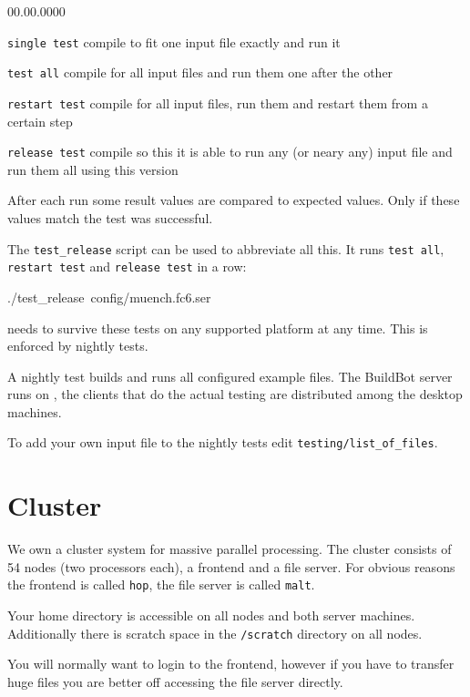 \begin{lyxlist}{00.00.0000}
\item [{\texttt{single~test}}] compile \ccarat{} to fit one input file
exactly and run it
\item [{\texttt{test~all}}] compile \ccarat{} for all input files and
run them one after the other
\item [{\texttt{restart~test}}] compile \ccarat{} for all input files,
run them and restart them from a certain step
\item [{\texttt{release~test}}] compile \ccarat{} so this it is able
to run any (or neary any) input file and run them all using this version
\end{lyxlist}
After each run some result values are compared to expected values.
Only if these values match the test was successful.

The \texttt{test\_release} script can be used to abbreviate all this.
It runs \texttt{test all}, \texttt{restart test} and \texttt{release
test} in a row:

\begin{lyxcode}
./test\_release~config/muench.fc6.ser
\end{lyxcode}
\ccarat{} needs to survive these tests on any supported platform
at any time. This is enforced by nightly tests.

A nightly test builds and runs all configured example files. The BuildBot
server runs on \gauss{}, the clients that do the actual testing are
distributed among the desktop machines.

To add your own input file to the nightly tests edit \texttt{testing/list\_of\_files}.


\section{Cluster}

We own a cluster system for massive parallel processing. The cluster
consists of 54 nodes (two processors each), a frontend and a file
server. For obvious reasons the frontend is called \texttt{hop}, the
file server is called \texttt{malt}.

Your home directory is accessible on all nodes and both server machines.
Additionally there is scratch space in the \texttt{/scratch} directory
on all nodes.

You will normally want to login to the frontend, however if you have
to transfer huge files you are better off accessing the file server
directly.



